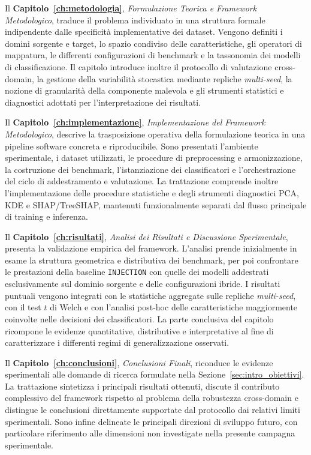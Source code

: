 Il \textbf{Capitolo~\ref{ch:metodologia}}, \textit{Formulazione Teorica e Framework Metodologico}, traduce il problema individuato in una struttura formale indipendente dalle specificità implementative dei dataset. 
Vengono definiti i domini sorgente e target, lo spazio condiviso delle caratteristiche, gli operatori di mappatura, le differenti configurazioni di benchmark e la tassonomia dei modelli di classificazione. 
Il capitolo introduce inoltre il protocollo di valutazione cross-domain, la gestione della variabilità stocastica mediante repliche \textit{multi-seed}, la nozione di granularità della componente malevola e gli strumenti statistici e diagnostici adottati per l'interpretazione dei risultati.

Il \textbf{Capitolo~\ref{ch:implementazione}}, \textit{Implementazione del Framework Metodologico}, descrive la trasposizione operativa della formulazione teorica in una pipeline software concreta e riproducibile. 
Sono presentati l'ambiente sperimentale, i dataset utilizzati, le procedure di preprocessing e armonizzazione, la costruzione dei benchmark, l'istanziazione dei classificatori e l'orchestrazione del ciclo di addestramento e valutazione. 
La trattazione comprende inoltre l'implementazione delle procedure statistiche e degli strumenti diagnostici PCA, KDE e SHAP/TreeSHAP, mantenuti funzionalmente separati dal flusso principale di training e inferenza.

Il \textbf{Capitolo~\ref{ch:risultati}}, \textit{Analisi dei Risultati e Discussione Sperimentale}, presenta la validazione empirica del framework. 
L'analisi prende inizialmente in esame la struttura geometrica e distributiva dei benchmark, per poi confrontare le prestazioni della baseline \texttt{INJECTION} con quelle dei modelli addestrati esclusivamente sul dominio sorgente e delle configurazioni ibride. 
I risultati puntuali vengono integrati con le statistiche aggregate sulle repliche \textit{multi-seed}, con il test $t$ di Welch e con l'analisi post-hoc delle caratteristiche maggiormente coinvolte nelle decisioni dei classificatori. 
La parte conclusiva del capitolo ricompone le evidenze quantitative, distributive e interpretative al fine di caratterizzare i differenti regimi di generalizzazione osservati.

Il \textbf{Capitolo~\ref{ch:conclusioni}}, \textit{Conclusioni Finali}, riconduce le evidenze sperimentali alle domande di ricerca formulate nella Sezione~\ref{sec:intro_obiettivi}. 
La trattazione sintetizza i principali risultati ottenuti, discute il contributo complessivo del framework rispetto al problema della robustezza cross-domain e distingue le conclusioni direttamente supportate dal protocollo dai relativi limiti sperimentali. 
Sono infine delineate le principali direzioni di sviluppo futuro, con particolare riferimento alle dimensioni non investigate nella presente campagna sperimentale.

